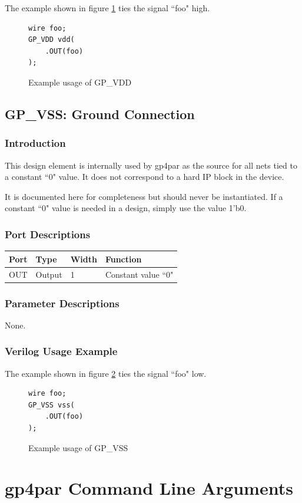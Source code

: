 \documentclass{article}
\begin{document}
The example shown in figure \ref{gp-vdd-example} ties the signal ``foo" high.

\begin{figure}[h]
\begin{lstlisting}
wire foo;
GP_VDD vdd(
	.OUT(foo)
);
\end{lstlisting}
\caption{Example usage of GP\_VDD}
\label{gp-vdd-example}
\end{figure}


\pagebreak
\subsection{GP\_VSS: Ground Connection}

\subsubsection{Introduction}
This design element is internally used by gp4par as the source for all nets tied to a constant ``0" value. It does not 
correspond to a hard IP block in the device.

It is documented here for completeness but should never be instantiated. If a constant ``0" value is needed in a 
design, simply use the value 1'b0.

\subsubsection{Port Descriptions}

\begin{tabularx}{4in}{|l|l|l|X|}
\hline
{\bfseries Port} & {\bfseries Type} & {\bfseries Width} & {\bfseries Function} \\
\hline
OUT & Output & 1 & Constant value ``0" \\
\hline
\end{tabularx}

\subsubsection{Parameter Descriptions}

None.

\subsubsection{Verilog Usage Example}

The example shown in figure \ref{gp-vss-example} ties the signal ``foo" low.

\begin{figure}[h]
\begin{lstlisting}
wire foo;
GP_VSS vss(
	.OUT(foo)
);
\end{lstlisting}
\caption{Example usage of GP\_VSS}
\label{gp-vss-example}
\end{figure}

\pagebreak
\section{gp4par Command Line Arguments}
\end{document}

